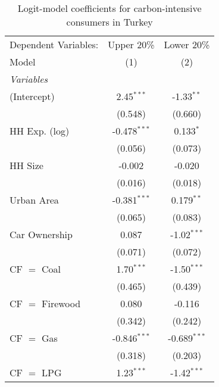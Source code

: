 
\begin{table}[htbp!]
   \centering
   \small
   \begin{adjustbox}{width = 1\textwidth, max height = 0.95\textheight, center}
      \begin{threeparttable}[b]
         \caption{\label{tab:Logit_1_TUR} Logit-model coefficients for carbon-intensive consumers in Turkey}
         \begin{tabular}{lcc}
            \tabularnewline \midrule \midrule
            Dependent Variables: & Upper 20\%     & Lower 20\%\\   
            Model                & (1)            & (2)\\  
            \midrule
            \emph{Variables}\\
            (Intercept)          & 2.45$^{***}$   & -1.33$^{**}$\\   
                                 & (0.548)        & (0.660)\\   
            HH Exp. (log)        & -0.478$^{***}$ & 0.133$^{*}$\\   
                                 & (0.056)        & (0.073)\\   
            HH Size              & -0.002         & -0.020\\   
                                 & (0.016)        & (0.018)\\   
            Urban Area           & -0.381$^{***}$ & 0.179$^{**}$\\   
                                 & (0.065)        & (0.083)\\   
            Car Ownership        & 0.087          & -1.02$^{***}$\\   
                                 & (0.071)        & (0.072)\\   
            CF $=$ Coal          & 1.70$^{***}$   & -1.50$^{***}$\\   
                                 & (0.465)        & (0.439)\\   
            CF $=$ Firewood      & 0.080          & -0.116\\   
                                 & (0.342)        & (0.242)\\   
            CF $=$ Gas           & -0.846$^{***}$ & -0.689$^{***}$\\   
                                 & (0.318)        & (0.203)\\   
            CF $=$ LPG           & 1.23$^{***}$   & -1.42$^{***}$\\   

\end{tabular}
\end{threeparttable}
\end{adjustbox}
\end{table}
